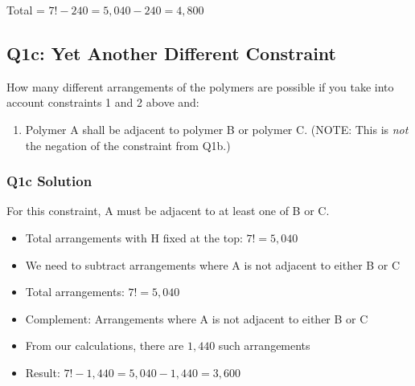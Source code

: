 \documentclass{article}
\begin{document}
Total = $7! - 240 = 5,040 - 240 = 4,800$


\subsection*{Q1c: Yet Another Different Constraint}

How many different arrangements of the polymers are possible if you take into account constraints 1 and 2 above and:

\begin{enumerate}[resume]
    \item Polymer A shall be adjacent to polymer B or polymer C. (NOTE: This is \textit{not} the negation of the constraint from Q1b.)
\end{enumerate}

\subsubsection*{Q1c Solution}

For this constraint, A must be adjacent to at least one of B or C.

\begin{itemize}
    \item Total arrangements with H fixed at the top: $7! = 5,040$
    \item We need to subtract arrangements where A is not adjacent to either B or C
\end{itemize}

\begin{itemize}
    \item Total arrangements: $7! = 5,040$
    \item Complement: Arrangements where A is not adjacent to either B or C
    \item From our calculations, there are $1,440$ such arrangements
    \item Result: $7! - 1,440 = 5,040 - 1,440 = 3,600$
\end{itemize}

\end{document}
